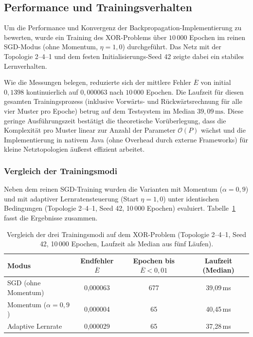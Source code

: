 \subsection{Performance und Trainingsverhalten}
\label{sec:performance}

Um die Performance und Konvergenz der Backpropagation-Implementierung zu bewerten, wurde ein Training des XOR-Problems über $10\,000$ Epochen im reinen SGD-Modus (ohne Momentum, $\eta = 1{,}0$) durchgeführt. Das Netz mit der Topologie 2--4--1 und dem festen Initialisierungs-Seed 42 zeigte dabei ein stabiles Lernverhalten.

Wie die Messungen belegen, reduzierte sich der mittlere Fehler $\overline{E}$ von initial $0{,}1398$ kontinuierlich auf $0{,}000063$ nach $10\,000$ Epochen. Die Laufzeit für diesen gesamten Trainingsprozess (inklusive Vorwärts- und Rückwärtsrechnung für alle vier Muster pro Epoche) betrug auf dem Testsystem im Median $39{,}09\,\mathrm{ms}$. Diese geringe Ausführungszeit bestätigt die theoretische Vorüberlegung, dass die Komplexität pro Muster linear zur Anzahl der Parameter $\mathcal{O}(P)$ wächst und die Implementierung in nativem Java (ohne Overhead durch externe Frameworks) für kleine Netztopologien äußerst effizient arbeitet.

\subsubsection{Vergleich der Trainingsmodi}
Neben dem reinen SGD-Training wurden die Varianten mit Momentum ($\alpha=0{,}9$) und mit adaptiver Lernratensteuerung (Start $\eta=1{,}0$) unter identischen Bedingungen (Topologie 2--4--1, Seed 42, 10\,000 Epochen) evaluiert. Tabelle~\ref{tab:modi-vergleich} fasst die Ergebnisse zusammen.

\begin{table}[htbp]
	\centering
	\begin{tabular}{lccc}
		\toprule
		\textbf{Modus}            & \textbf{Endfehler $\overline{E}$} & \textbf{Epochen bis $\overline{E}<0{,}01$} & \textbf{Laufzeit (Median)} \\
		\midrule
		SGD (ohne Momentum)       & 0{,}000063                        & 677                                        & 39{,}09\,ms                \\
		Momentum ($\alpha=0{,}9$) & 0{,}000004                        & 65                                         & 40{,}45\,ms                \\
		Adaptive Lernrate         & 0{,}000029                        & 65                                         & 37{,}28\,ms                \\
		\bottomrule
	\end{tabular}
	\caption{Vergleich der drei Trainingsmodi auf dem XOR-Problem
		(Topologie 2--4--1, Seed 42, 10\,000 Epochen, Laufzeit als Median aus fünf Läufen).}
	\label{tab:modi-vergleich}
\end{table}

